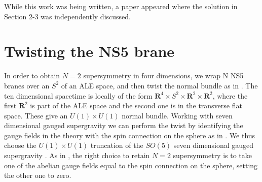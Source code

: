 \documentclass[a4paper,12pt]{article}
\begin{document}
While this work was being written, a paper \cite{martelli} appeared
where the solution in Section 2-3 was independently discussed.   

\section{Twisting the NS5 brane}
In order to obtain $N=2$ supersymmetry in four dimensions, we wrap N NS5
branes over an $S^{2}$ of an ALE space, and then  twist the normal bundle as in \cite{vafa}.
The ten dimensional spacetime is locally of the form ${\mathbf{R}}^{4}\times S^{2} \times{\mathbf{R}}^{2}\times\mathbf{R}^{2}$, where the first $\mathbf{R}^{2}$ is part of the ALE space and the second one is in the transverse flat space. These give
an $U(1)\times U(1)$ normal bundle. Working with seven dimensional gauged supergravity we can perform the twist by identifying the gauge fields in the theory
with the spin connection on the sphere as in \cite{mn1,mn2}. 
We thus choose the $U(1)\times U(1)$ truncation \cite{minasian} of the $SO(5)$ seven dimensional gauged supergravity \cite{pernici}.
As in \cite{mn1}, the right choice to retain $N=2$ supersymmetry is
to take one of the abelian gauge fields equal to the spin connection on the sphere, setting the other one to zero.
\end{document}
